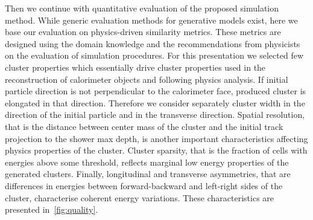 Then we continue with quantitative evaluation of the proposed simulation
method. While generic evaluation methods for generative models exist,
here we base our evaluation on physics-driven similarity
metrics. These metrics are designed using the domain knowledge and the
recommendations from physicists on the evaluation of simulation
procedures. 
For this presentation we selected few cluster properties which essentially
drive cluster properties used in the reconstruction of calorimeter objects
and following physics analysis. If initial particle direction is not
perpendicular to the calorimeter face, produced cluster is elongated
in that direction. Therefore we consider separately cluster width in
the direction of the initial particle and in the transverse
direction. Spatial resolution, that is the distance between center
mass of the cluster and the initial track projection to the shower max
depth, is another important characteristics affecting physics
properties of the cluster. Cluster sparsity, that is the fraction of
cells with energies above some threshold, reflects marginal low
energy properties of the generated clusters. Finally, longitudinal and
transverse asymmetries, that are differences in energies between
forward-backward and left-right sides of the cluster, characterise
coherent energy variations.  
 These  characteristics are presented in~\cref{fig:quality}. 


